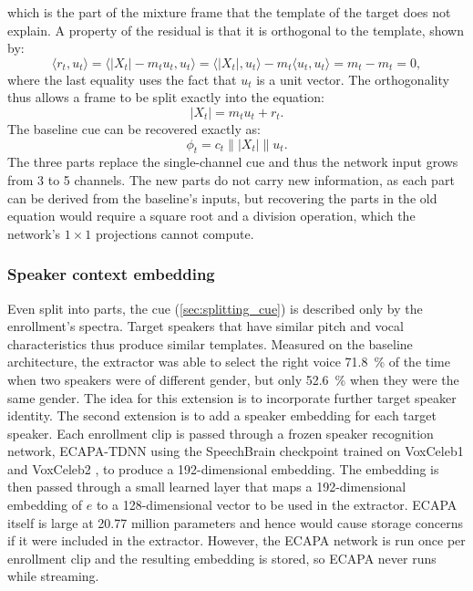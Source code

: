 which is the part of the mixture frame that the template of the target does not explain. A property of the residual is that it is orthogonal to the template, shown by:
\begin{equation}
  \big\langle r_t, u_t \big\rangle
  = \big\langle |X_t| - m_t u_t, u_t \big\rangle
  = \big\langle |X_t|, u_t \big\rangle - m_t \big\langle u_t, u_t \big\rangle
  = m_t - m_t = 0,
  \label{eq:cue-residual-orthogonal}
\end{equation}
where the last equality uses the fact that $u_t$ is a unit vector. The orthogonality thus allows a frame to be split exactly into the equation:
\begin{equation}
  |X_t| = m_t u_t + r_t.
  \label{eq:cue-split}
\end{equation}
The baseline cue can be recovered exactly as:
\begin{equation}
  \phi_t = c_t\big\lVert |X_t| \big\rVert u_t.
  \label{eq:cue-rebuild}
\end{equation}
The three parts replace the single-channel cue and thus the network input grows from 3 to 5 channels. The new parts do not carry new information, as each part can be derived from the baseline's inputs, but recovering the parts in the old equation would require a square root and a division operation, which the network's $1\times1$ projections cannot compute.

\subsubsection{Speaker context embedding}
\label{sec:speaker_context_embedding}
Even split into parts, the cue (\autoref{sec:splitting_cue}) is described only by the enrollment's spectra. Target speakers that have similar pitch and vocal characteristics thus produce similar templates. Measured on the baseline architecture, the extractor was able to select the right voice \SI{71.8}{\percent} of the time when two speakers were of different gender, but only \SI{52.6}{\percent} when they were the same gender. The idea for this extension is to incorporate further target speaker identity. The second extension is to add a speaker embedding for each target speaker. Each enrollment clip is passed through a frozen speaker recognition network, ECAPA-TDNN \cite{desplanques2020ecapa} using the SpeechBrain checkpoint \cite{ravanelli2021speechbrain} trained on VoxCeleb1 and VoxCeleb2 \cite{nagrani2017voxceleb, chung2018voxceleb2}, to produce a 192-dimensional embedding. The embedding is then passed through a small learned layer that maps a 192-dimensional embedding of $e$ to a 128-dimensional vector to be used in the extractor. ECAPA itself is large at 20.77 million parameters and hence would cause storage concerns if it were included in the extractor. However, the ECAPA network is run once per enrollment clip and the resulting embedding is stored, so ECAPA never runs while streaming.


